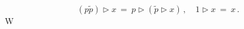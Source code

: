 \begin{equation} (p\tilde{p})\triangleright x \ = \
p\triangleright (\tilde{p} \triangleright x)\, ,\quad
1\triangleright x \ = \ x\, .\label{r314}\end{equation}W
